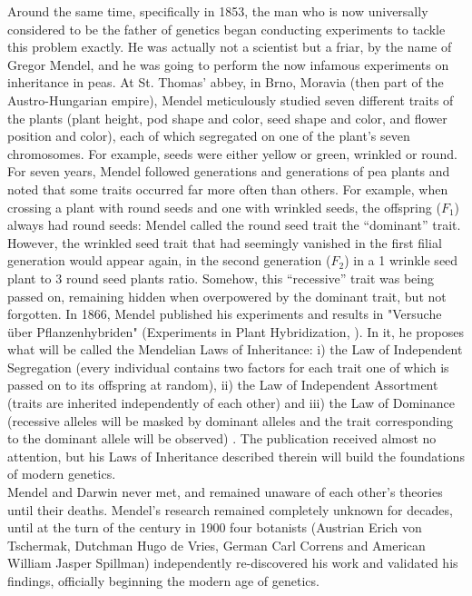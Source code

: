 Around the same time, specifically in 1853, the man who is now universally considered to be the father of genetics began conducting experiments to tackle this problem exactly. 
He was actually not a scientist but a friar, by the name of Gregor Mendel, and he was going to perform the now infamous experiments on inheritance in peas. 
At St. Thomas’ abbey, in Brno, Moravia (then part of the Austro-Hungarian empire), Mendel meticulously studied seven different traits of the plants (plant height, pod shape and color, seed shape and color, and flower position and color), each of which segregated on one of the plant's seven chromosomes. 
For example, seeds were either yellow or green, wrinkled or round. For seven years, Mendel followed generations and generations of pea plants and noted that some traits occurred far more often than others. 
For example, when crossing a plant with round seeds and one with wrinkled seeds, the offspring ($F_1$) always had round seeds: Mendel called the round seed trait the “dominant” trait. However, the wrinkled seed trait that had seemingly vanished in the first filial generation would appear again, in the second generation ($F_2$) in a 1 wrinkle seed plant to 3 round seed plants ratio. Somehow, this “recessive” trait was being passed on, remaining hidden when overpowered by the dominant trait, but not forgotten. 
In 1866, Mendel published his experiments and results in "Versuche über Pflanzenhybriden" (Experiments in Plant Hybridization, \cite{mendel1996experiments}). 
In it, he proposes what will be called the Mendelian Laws of Inheritance: i) the Law of Independent Segregation (every individual contains two factors for each trait one of which is passed on to its offspring at random), ii) the Law of Independent Assortment (traits are inherited independently of each other) and iii) the Law of Dominance (recessive alleles will be masked by dominant alleles and the trait corresponding to the dominant allele will be observed) \cite{mendel1996experiments}. 
The publication received almost no attention, but his Laws of Inheritance described therein will build the foundations of modern genetics.\\

Mendel and Darwin never met, and remained unaware of each other’s theories until their deaths. Mendel’s research remained completely unknown for decades, until at the turn of the century in 1900 four botanists (Austrian Erich von Tschermak, Dutchman Hugo de Vries, German Carl Correns and American William Jasper Spillman) independently re-discovered his work and validated his findings, officially beginning the modern age of genetics.\\ 

